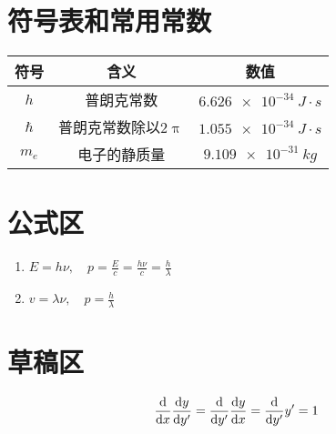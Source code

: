\documentclass{article}
\begin{document}
\appendix
\section{符号表和常用常数}
\begin{table}[H]
	\centering
	\renewcommand\arraystretch{1.5}
	\begin{tabular}{ccc}
		\toprule
		符号 & 含义 & 数值\\
		\midrule
		$h$ & 普朗克常数 & $\SI{6.626e-34}{J\cdot s}$\\
		$\hbar$ & 普朗克常数除以$2\uppi$ & $\SI{1.055e-34}{J\cdot s}$\\
		$m_e$ & 电子的静质量 & $\SI{9.109e-31}{kg}$\\
		\bottomrule
	\end{tabular}
\end{table}
\section{公式区}
\begin{enumerate}[label=(\alph*)]
	\item $E=h\nu,\quad p=\frac{E}{c}=\frac{h\nu}{c}=\frac{h}{\lambda}$
	\item $v=\lambda \nu,\quad p=\frac{h}{\lambda}$
\end{enumerate}

\section{草稿区}
\[\frac{\dif}{\dif x}\frac{\dif y}{\dif y'}=\frac{\dif}{\dif y'}\frac{\dif y}{\dif x}=\frac{\dif}{\dif y'}y'=1\]
\end{document}
